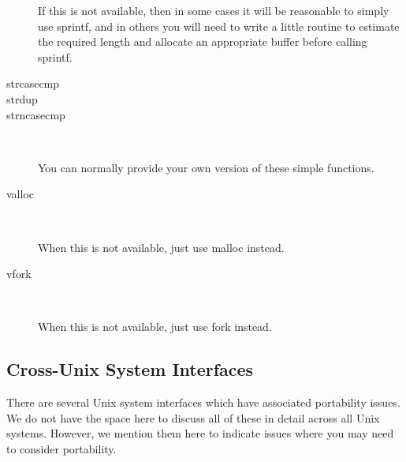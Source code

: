 \begin{description}
    If this is not available, then in some cases it will be reasonable to simply use sprintf, and in others you will need to write a little routine to estimate the required length and allocate an appropriate buffer before calling sprintf. 
\item[strcasecmp]
\item[strdup]
\item[strncasecmp]
\

    You can normally provide your own version of these simple functions. 
\item[valloc]
\

    When this is not available, just use malloc instead. 
\item[vfork]
\

    When this is not available, just use fork instead.
\end{description}

\subsection{Cross-Unix System Interfaces}

There are several Unix system interfaces which have associated portability issues. We do not have the space here to discuss all of these in detail across all Unix systems. However, we mention them here to indicate issues where you may need to consider portability. 

